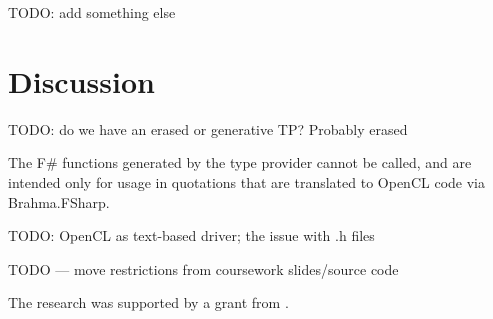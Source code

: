 \documentclass[sigplan,review]{acmart}\settopmatter{printfolios=true}
\begin{document}
TODO: add something else

\section{Discussion}

TODO: do we have an erased or generative TP? Probably erased

The F\# functions generated by the type provider cannot be called, and are intended only for usage in quotations that are translated to OpenCL code via Brahma.FSharp.

TODO: OpenCL as text-based driver; the issue with .h files

TODO --- move restrictions from coursework slides/source code

\begin{acks}
The research was supported by a grant from .
\end{acks}




\end{document}
